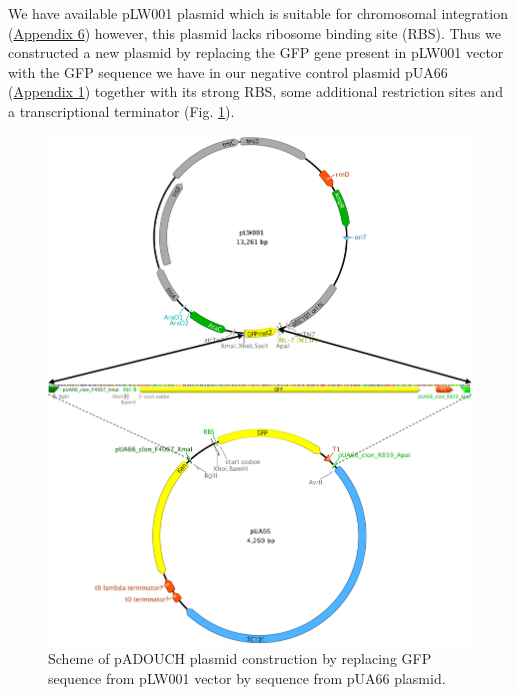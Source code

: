 We have available pLW001 plasmid which is suitable for chromosomal integration (\hyperlink{pLW001}{Appendix 6}) however, this plasmid lacks ribosome binding site (RBS).
Thus we constructed a new plasmid by replacing the GFP gene present in pLW001 vector with the GFP sequence we have in our negative control plasmid pUA66 (\hyperlink{pUA66seq}{Appendix 1}) together with its strong RBS, some additional restriction sites and a transcriptional terminator (Fig. \ref{cloning}).
\begin{figure}[h!]
  \centering
  \includegraphics[scale=0.4]{text/Pictures/Cloning.png}
	\caption{Scheme of pADOUCH plasmid construction by replacing GFP sequence from pLW001 vector by sequence from pUA66 plasmid.}
	\label{cloning}
\end{figure}

